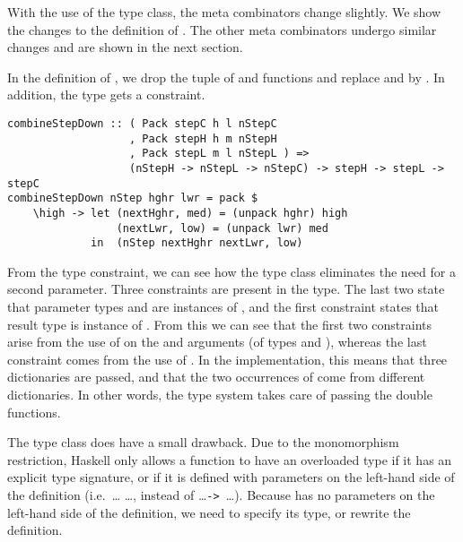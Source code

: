 \documentclass[preprint,natbib]{sigplanconf}
\begin{document}

With the use of the type class, the meta combinators change slightly. We show the changes to the definition of . The other meta combinators undergo similar changes and are shown in the next section.

In the definition of , we drop the  tuple of   and  functions and replace  and  by . In addition, the type gets a constraint.

\begin{small}
\begin{verbatim}
combineStepDown :: ( Pack stepC h l nStepC 
                   , Pack stepH h m nStepH
                   , Pack stepL m l nStepL ) => 
                   (nStepH -> nStepL -> nStepC) -> stepH -> stepL -> stepC
combineStepDown nStep hghr lwr = pack $
    \high -> let (nextHghr, med) = (unpack hghr) high
                 (nextLwr, low) = (unpack lwr) med
             in  (nStep nextHghr nextLwr, low)
\end{verbatim} %
\end{small}

\bc
From the type constraint, we can see how the type class eliminates the need for a second  parameter. Three  constraints are present in the type. The last two state that parameter types  and  are instances of , and the first constraint states that result type  is instance of . From this we can see that the first two constraints arise from the use of  on the  and  arguments (of types  and ), whereas the last constraint comes from the use of . In the implementation, this means that three dictionaries are passed, and that the two occurrences of  come from different dictionaries. In other words, the type system takes care of passing the double  functions.
\ec

The type class does have a small drawback. Due to the monomorphism restriction, Haskell only allows a function to have an overloaded type if it has an explicit type signature, or if it is defined with parameters on the left-hand side of the definition (i.e.\ \dots {} \dots, instead of \dots {}\verb|-> |\dots). Because  has no parameters on the left-hand side of the definition, we need to specify its type, or rewrite the definition.
\end{document}
